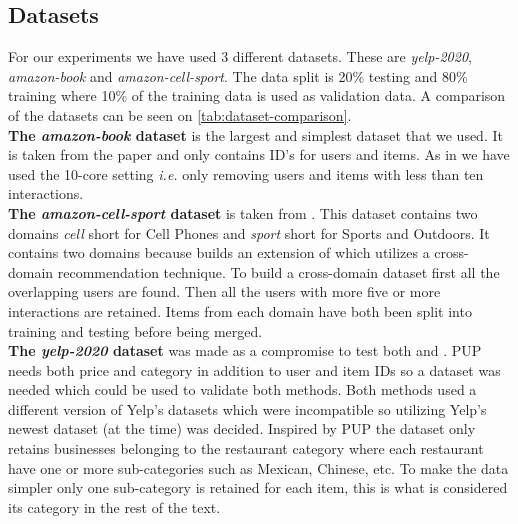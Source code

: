 \subsection{Datasets}
For our experiments we have used 3 different datasets.
These are \textit{yelp-2020}, \textit{amazon-book} and \textit{amazon-cell-sport}.
The data split is 20\% testing and 80\% training where 10\% of the training data is used as validation data.
A comparison of the datasets can be seen on \autoref{tab:dataset-comparison}.
\\
\textbf{The \textit{amazon-book} dataset} is the largest and simplest dataset that we used.
It is taken from the \cite{lightgcn} paper and only contains ID's for users and items.
As in \cite{lightgcn} we have used the 10-core setting \textit{i.e.} only removing users and items with less than ten interactions.
\\
\textbf{The \textit{amazon-cell-sport} dataset} is taken from \cite{BiTGCF}.
This dataset contains two domains \textit{cell} short for Cell Phones and \textit{sport} short for Sports and Outdoors.
It contains two domains because \cite{BiTGCF} builds an extension of \cite{lightgcn} which utilizes a cross-domain recommendation technique.
To build a cross-domain dataset first all the overlapping users are found.
Then all the users with more five or more interactions are retained.
Items from each domain have both been split into training and testing before being merged.
\\
\textbf{The \textit{yelp-2020} dataset} was made as a compromise to test both \cite{lightgcn} and \cite{PUP}.
PUP needs both price and category in addition to user and item IDs so a dataset was needed which could be used to validate both methods.
Both methods used a different version of Yelp's datasets which were incompatible so utilizing Yelp's newest dataset (at the time) was decided.
Inspired by PUP the dataset only retains businesses belonging to the restaurant category where each restaurant have one or more sub-categories such as Mexican, Chinese, etc.
To make the data simpler only one sub-category is retained for each item, this is what is considered its category in the rest of the text.


